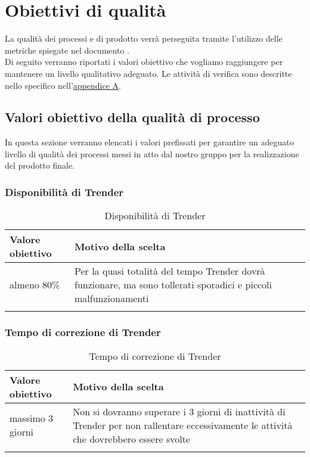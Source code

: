 \documentclass[../PianoDiQualifica_v4.0.0.tex]{subfiles}
\begin{document}
\section{Obiettivi di qualità}

	La qualità dei processi e di prodotto verrà perseguita tramite l'utilizzo delle metriche spiegate nel documento \normediprogettov.\\
	Di seguito verranno riportati i valori obiettivo che vogliamo raggiungere per mantenere un livello qualitativo adeguato.
	Le attività di verifica sono descritte nello specifico nell'\hyperref[sec:verifica]{\underline{appendice A}}.

	\subsection{Valori obiettivo della qualità di processo}
		In questa sezione verranno elencati i valori prefissati per garantire un adeguato livello di qualità dei processi messi in atto dal nostro gruppo per la realizzazione del prodotto finale.
		\subsubsection{Disponibilità di Trender}
			\begin{longtable}[c] { >{\centering\arraybackslash}p{4cm} p{7cm} }
				\toprule
				\centerline{\textbf{Valore obiettivo}} & \centerline{\textbf{Motivo della scelta}} \\
				\midrule
					almeno 80\% &	Per la quasi totalità del tempo Trender dovrà funzionare, ma sono tollerati sporadici e piccoli malfunzionamenti \\
				\bottomrule
				\caption{Disponibilità di Trender}
			\end{longtable}

		\subsubsection{Tempo di correzione di Trender}
			\begin{longtable}[c] { >{\centering\arraybackslash}p{4cm} p{7cm} }
				\toprule
				\centerline{\textbf{Valore obiettivo}} & \centerline{\textbf{Motivo della scelta}} \\
				\midrule
					massimo 3 giorni &	 Non si dovranno superare i 3 giorni di inattività di Trender per non rallentare eccessivamente le attività che dovrebbero essere svolte \\
				\bottomrule
				\caption{Tempo di correzione di Trender}
			\end{longtable}
\end{document}

